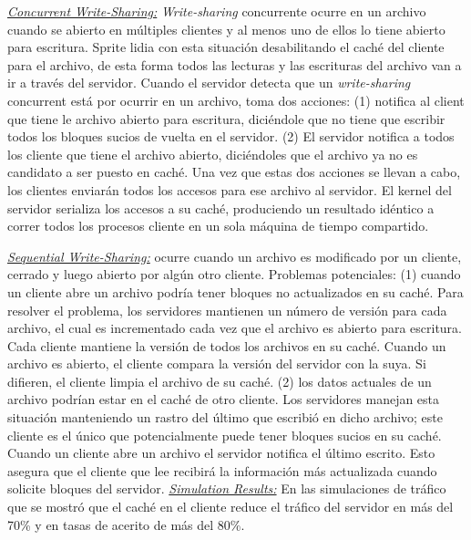 \underline{\emph{Concurrent Write-Sharing:}} \emph{Write-sharing} concurrente ocurre en un archivo cuando se abierto en múltiples clientes y al menos uno de ellos lo tiene abierto para escritura. Sprite lidia con esta situación desabilitando el caché del cliente para el archivo, de esta forma todos las lecturas y las escrituras del archivo van a ir a través del servidor. Cuando el servidor detecta que un \emph{write-sharing} concurrent está por ocurrir en un archivo, toma dos acciones: (1) notifica al client que tiene le archivo abierto para escritura, diciéndole que no tiene que escribir todos los bloques sucios de vuelta en el servidor. (2) El servidor notifica a todos los cliente que tiene el archivo abierto, diciéndoles que el archivo ya no es candidato a ser puesto en caché. Una vez que estas dos acciones se llevan a cabo, los clientes enviarán todos los accesos para ese archivo al servidor. El kernel del servidor serializa los accesos a su caché, produciendo un resultado idéntico a correr todos los procesos cliente en un sola máquina de tiempo compartido. 

\underline{\emph{Sequential Write-Sharing:}} ocurre cuando un archivo es modificado por un cliente, cerrado y luego abierto por algún otro cliente. Problemas potenciales: (1) cuando un cliente abre un archivo podría tener bloques no actualizados en su caché. Para resolver el problema, los servidores mantienen un número de versión para cada archivo, el cual es incrementado cada vez que el archivo es abierto para escritura. Cada cliente mantiene la versión de todos los archivos en su caché. Cuando un archivo es abierto, el cliente compara la versión del servidor con la suya. Si difieren, el cliente limpia el archivo de su caché. (2) los datos actuales de un archivo podrían estar en el caché de otro cliente. Los servidores manejan esta situación manteniendo un rastro del último que escribió en dicho archivo; este cliente es el único que potencialmente puede tener bloques sucios en su caché. Cuando un cliente abre un archivo el servidor notifica el último escrito. Esto asegura que el cliente que lee recibirá la información más actualizada cuando solicite bloques del servidor. \underline{\emph{Simulation Results:}} En las simulaciones de tráfico que se mostró que el caché en el cliente reduce el tráfico del servidor en más del 70\% y en tasas de acerito de más del 80\%.

